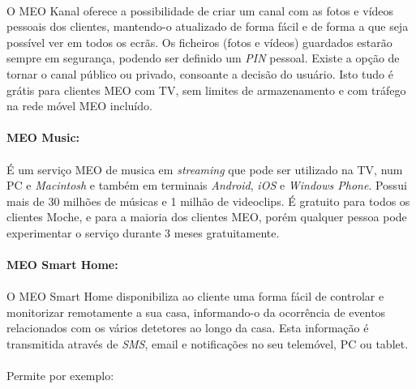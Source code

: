 \documentclass{report}
\begin{document}
\paragraph{}O MEO Kanal oferece a possibilidade de criar um canal com as fotos e vídeos pessoais dos clientes, mantendo-o atualizado de forma fácil e de forma a que seja possível ver em todos os ecrãs. Os ficheiros (fotos e vídeos) guardados estarão sempre em segurança, podendo ser definido um \textit{PIN} pessoal. Existe a opção de tornar o canal público ou privado, consoante a decisão do usuário. Isto tudo é grátis para clientes MEO com TV, sem limites de armazenamento e com tráfego na rede móvel MEO incluído.

\paragraph{MEO Music:}

\paragraph{}É um serviço MEO de musica em \textit{streaming} que pode ser utilizado na TV, num PC e \textit{Macintosh} e também em terminais \textit{Android}, \textit{iOS} e \textit{Windows Phone}. Possui mais de 30 milhões de músicas e 1 milhão de videoclips. É gratuito para todos os clientes Moche, e para a maioria dos clientes MEO, porém qualquer pessoa pode experimentar o serviço durante 3 meses gratuitamente.

\paragraph{MEO Smart Home:}

\paragraph{}O MEO Smart Home disponibiliza ao cliente uma forma fácil de controlar e monitorizar remotamente a sua casa, informando-o da ocorrência de eventos relacionados com os vários detetores ao longo da casa. Esta informação é transmitida através de \textit{SMS}, email e notificações no seu telemóvel, PC ou tablet.

\paragraph{}Permite por exemplo:
\end{document}
